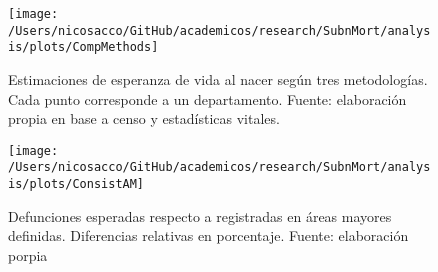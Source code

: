 \documentclass[12pt,spanish,]{article}
\begin{document}
\begin{figure}

{\centering \texttt{[image: /Users/nicosacco/GitHub/academicos/research/SubnMort/analysis/plots/CompMethods]} 

}

\caption{Estimaciones de esperanza de vida al nacer según tres metodologías. Cada punto corresponde a un departamento. Fuente: elaboración propia en base a censo y estadísticas vitales.}\label{fig:comparativeMeth}
\end{figure}

\begin{figure}

{\centering \texttt{[image: /Users/nicosacco/GitHub/academicos/research/SubnMort/analysis/plots/ConsistAM]} 

}

\caption{Defunciones esperadas respecto a registradas en áreas mayores definidas. Diferencias relativas en porcentaje. Fuente: elaboración porpia}\label{fig:consistAM}
\end{figure}
\end{document}

